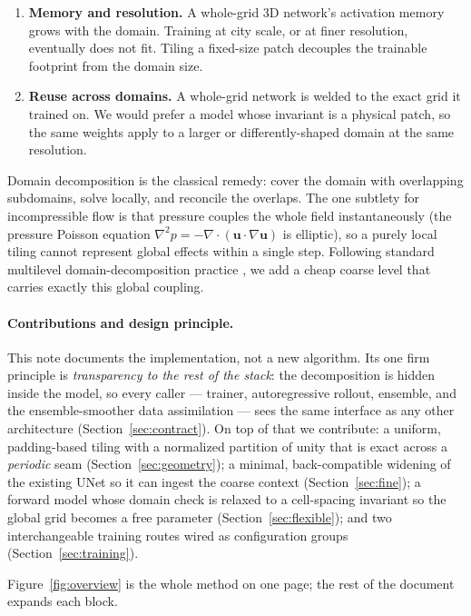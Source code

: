 \documentclass[11pt]{article}
\begin{document}
\begin{enumerate}
\item \textbf{Memory and resolution.} A whole-grid 3D network's activation memory
grows with the domain. Training at city scale, or at finer resolution, eventually
does not fit. Tiling a fixed-size patch decouples the trainable footprint from the
domain size.
\item \textbf{Reuse across domains.} A whole-grid network is welded to the exact
grid it trained on. We would prefer a model whose invariant is a physical patch, so
the same weights apply to a larger or differently-shaped domain at the same
resolution.
\end{enumerate}

Domain decomposition is the classical remedy: cover the domain with overlapping
subdomains, solve locally, and reconcile the overlaps. The one subtlety for
incompressible flow is that pressure couples the whole field instantaneously (the
pressure Poisson equation $\nabla^2 p=-\nabla\!\cdot(\bm u\!\cdot\!\nabla\bm u)$ is
elliptic), so a purely local tiling cannot represent global effects within a single
step. Following standard multilevel domain-decomposition practice
\cite{dryja1994smalloverlap,dolean2024multilevel,li2020mgno}, we add a cheap coarse
level that carries exactly this global coupling.

\paragraph{Contributions and design principle.}
This note documents the implementation, not a new algorithm. Its one firm principle
is \emph{transparency to the rest of the stack}: the decomposition is hidden inside
the model, so every caller --- trainer, autoregressive rollout, ensemble, and the
ensemble-smoother data assimilation --- sees the same interface as any other
architecture (Section~\ref{sec:contract}). On top of that we contribute: a uniform,
padding-based tiling with a normalized partition of unity that is exact across a
\emph{periodic} seam (Section~\ref{sec:geometry}); a minimal, back-compatible
widening of the existing UNet so it can ingest the coarse context
(Section~\ref{sec:fine}); a forward model whose domain check is relaxed to a
cell-spacing invariant so the global grid becomes a free parameter
(Section~\ref{sec:flexible}); and two interchangeable training routes wired as
configuration groups (Section~\ref{sec:training}).

Figure~\ref{fig:overview} is the whole method on one page; the rest of the document
expands each block.
\end{document}
